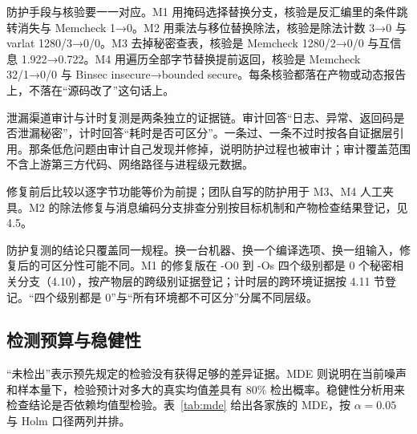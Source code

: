 防护手段与核验要一一对应。M1 用掩码选择替换分支，核验是反汇编里的条件跳转消失与 Memcheck 1→0。M2 用乘法与移位替换除法，核验是除法计数 3→0 与 varlat 1280/3→0/0。M3 去掉秘密查表，核验是 Memcheck 1280/2→0/0 与互信息 1.922→0.722。M4 用遍历全部字节替换提前返回，核验是 Memcheck 32/1→0/0 与 Binsec insecure→bounded secure。每条核验都落在产物或动态报告上，不落在“源码改了”这句话上。

泄漏渠道审计与计时复测是两条独立的证据链。审计回答“日志、异常、返回码是否泄漏秘密”，计时回答“耗时是否可区分”。一条过、一条不过时按各自证据层引用。那条低危问题由审计自己发现并修掉，说明防护过程也被审计；审计覆盖范围不含上游第三方代码、网络路径与进程级元数据。

修复前后比较以逐字节功能等价为前提；团队自写的防护用于 M3、M4 人工夹具。M2 的除法修复与消息编码分支排查分别按目标机制和产物检查结果登记，见 4.5。

防护复测的结论只覆盖同一规程。换一台机器、换一个编译选项、换一组输入，修复后的可区分性可能不同。M1 的修复版在 -O0 到 -Os 四个级别都是 0 个秘密相关分支（4.10），按产物层的跨级别证据登记；计时层的跨环境证据按 4.11 节登记。“四个级别都是 0”与“所有环境都不可区分”分属不同层级。

\subsection{检测预算与稳健性}

“未检出”表示预先规定的检验没有获得足够的差异证据。MDE 则说明在当前噪声和样本量下，检验预计对多大的真实均值差具有 80\% 检出概率。稳健性分析用来检查结论是否依赖均值型检验。表~\ref{tab:mde} 给出各家族的 MDE，按 $\alpha=0.05$ 与 Holm 口径两列并排。%

